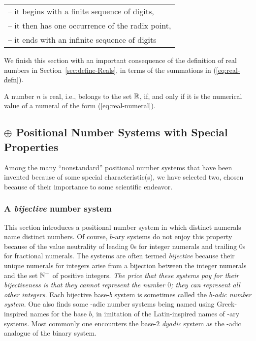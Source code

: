 \hspace*{.15in}
\begin{tabular}{l}
-- it begins with a finite sequence of digits, \\
-- it then has one occurrence of the radix point, \\
-- it ends with an infinite sequence of digits
\end{tabular}

\bigskip

We finish this section with an important consequence of the definition
of real numbers in Section~\ref{sec:define-Reals}, in terms of the
summations in (\ref{eq:real-defn}).

\begin{prop}
\label{thm:define-Reals-via-numerals}
A number $n$ is real, i.e., belongs to the set $\mathbb{R}$, if, and only if
it is the numerical value of a numeral of the form
(\ref{eq:real-numeral}).
\end{prop}

\subsection{$\oplus$ Positional Number Systems with Special Properties}
\label{sec:numerals-special-properties}

Among the many ``nonstandard'' positional number systems that have
been invented because of some special characteristic(s), we have
selected two, chosen because of their importance to some scientific
endeavor.

\subsubsection{A {\em bijective} number system}
\label{sec:bijective-adic}

This section introduces a positional number system in which distinct
numerals name distinct numbers.  Of course, $b$-ary systems do not
enjoy this property because of the value neutrality of leading $0$s
for integer numerals and trailing $0$s for fractional numerals.  The
systems are often termed {\it bijective} because their unique numerals
for integers arise from a bijection between the integer numerals and
the set $\mathbb{N}^+$ of positive integers.  {\em The price that these
  systems pay for their bijectiveness is that they cannot represent
  the number $0$; they can represent all other integers.}  Each
bijective base-$b$ system is sometimes called the {\it $b$-adic number
  system}.  One also finds
some -adic number systems being named using Greek-inspired names for
the base $b$, in imitation of the Latin-inspired names of -ary
systems.  Most commonly one encounters the base-$2$ {\it dyadic}
 system as the -adic analogue
of the binary system.

